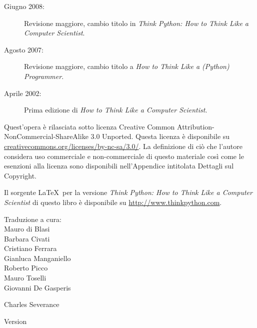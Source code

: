 \begin{latexonly}
{\begin{description}
\item[Giugno 2008:] Revisione maggiore, cambio titolo in
\emph{Think Python: How to Think Like
a Computer Scientist}.

\item[Agosto 2007:] Revisione maggiore, cambio titolo a
\emph{How to Think Like a (Python) Programmer}.

\item[Aprile 2002:] Prima edizione di  \emph{How to Think Like
a Computer Scientist}.

\end{description}

\vspace{0.2in}

Quest'opera \`{e} rilasciata sotto licenza Creative Common
Attribution-NonCommercial-ShareAlike 3.0 Unported.
Questa licenza \`{e} disponibile su
\url{creativecommons.org/licenses/by-nc-sa/3.0/}.  
La definizione di ci\`{o} che l'autore considera uso commerciale e non-commerciale di questo materiale cos\`{i} come le esenzioni alla licenza sono disponibili nell'Appendice intitolata Dettagli sul Copyright.

Il sorgente \LaTeX\ per la versione 
\emph{Think Python: How to Think Like
a Computer Scientist}
di questo libro \`{e} disponibile su
\url{http://www.thinkpython.com}.

\vspace{0.2in}

Traduzione a cura: \\Mauro di Blasi\\Barbara Civati \\Cristiano Ferrara\\Gianluca Manganiello\\Roberto Picco\\Mauro Toselli\\Giovanni De Gasperis

} %

\end{latexonly}



\begin{htmlonly}


{\Large \thetitle}

{\large 
Charles Severance}

Version \theversion

\setcounter{chapter}{-1}

\end{htmlonly}
